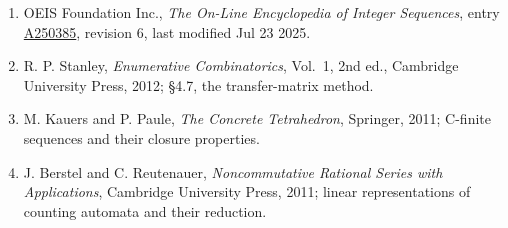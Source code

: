 \documentclass[11pt]{article}
\theoremstyle{definition}
\begin{document}
\begin{enumerate}

\item OEIS Foundation Inc., \emph{The On-Line Encyclopedia of Integer Sequences}, entry \href{https://oeis.org/A250385}{A250385}, revision 6, last modified Jul 23 2025.

\item R. P. Stanley, \emph{Enumerative Combinatorics}, Vol.~1, 2nd ed., Cambridge University Press, 2012; \S4.7, the transfer-matrix method.

\item M. Kauers and P. Paule, \emph{The Concrete Tetrahedron}, Springer, 2011; C-finite sequences and their closure properties.

\item J. Berstel and C. Reutenauer, \emph{Noncommutative Rational Series with Applications}, Cambridge University Press, 2011; linear representations of counting automata and their reduction.

\end{enumerate}
\end{document}
